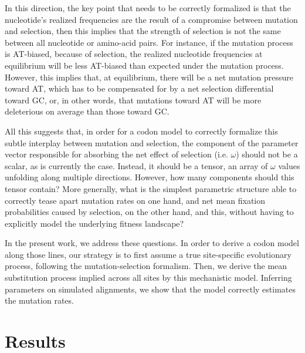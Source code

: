 In this direction, the key point that needs to be correctly formalized is that the nucleotide's realized frequencies are the result of a compromise between mutation and selection, then this implies that the strength of selection is not the same between all nucleotide or amino-acid pairs.
For instance, if the mutation process is AT-biased, because of selection, the realized nucleotide frequencies at equilibrium will be less AT-biased than expected under the mutation process.
However, this implies that, at equilibrium, there will be a net mutation pressure toward AT, which has to be compensated for by a net selection differential toward GC, or, in other words, that mutations toward AT will be more deleterious on average than those toward GC.

All this suggests that, in order for a codon model to correctly formalize this subtle interplay between mutation and selection, the component of the parameter vector responsible for absorbing the net effect of selection (i.e. $\omega$) should not be a scalar, as is currently the case.
Instead, it should be a tensor, an array of $\omega$ values unfolding along multiple directions.
However, how many components should this tensor contain?
More generally, what is the simplest parametric structure able to correctly tease apart mutation rates on one hand, and net mean fixation probabilities caused by selection, on the other hand, and this, without having to explicitly model the underlying fitness landscape?

In the present work, we address these questions.
In order to derive a codon model along those lines, our strategy is to first assume a true site-specific evolutionary process, following the mutation-selection formalism.
Then, we derive the mean substitution process implied across all sites by this mechanistic model.
Inferring parameters on simulated alignments, we show that the model correctly estimates the mutation rates.


\section{Results}

